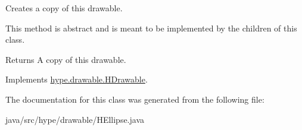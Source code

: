 Creates a copy of this drawable. 

This method is abstract and is meant to be implemented by the children of this class.

\begin{DoxyReturn}{Returns}
A copy of this drawable. 
\end{DoxyReturn}


Implements \hyperlink{classhype_1_1drawable_1_1_h_drawable_a9664f945675efa02d30228ca27d5819d}{hype.\-drawable.\-H\-Drawable}.



The documentation for this class was generated from the following file\-:\begin{DoxyCompactItemize}
\item 
java/src/hype/drawable/H\-Ellipse.\-java\end{DoxyCompactItemize}
